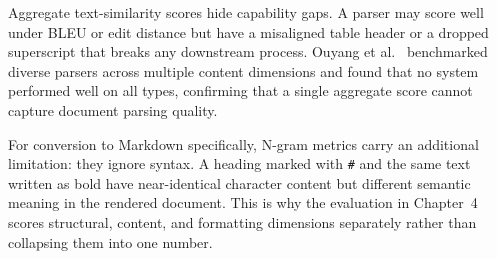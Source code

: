 Aggregate text-similarity scores hide capability gaps. A parser may score well
under BLEU or edit distance but have a misaligned table header or a dropped
superscript that breaks any downstream process. Ouyang et al.\
\autocite{omnidocbench2025} benchmarked diverse parsers across multiple content
dimensions and found that no system performed well on all types, confirming
that a single aggregate score cannot capture document parsing quality.

For conversion to Markdown specifically, N-gram metrics carry an additional
limitation: they ignore syntax. A heading marked with \texttt{\#} and the same
text written as bold have near-identical character content but different semantic
meaning in the rendered document. This is why the evaluation in Chapter~4 scores
structural, content, and formatting dimensions separately rather than collapsing
them into one number.
